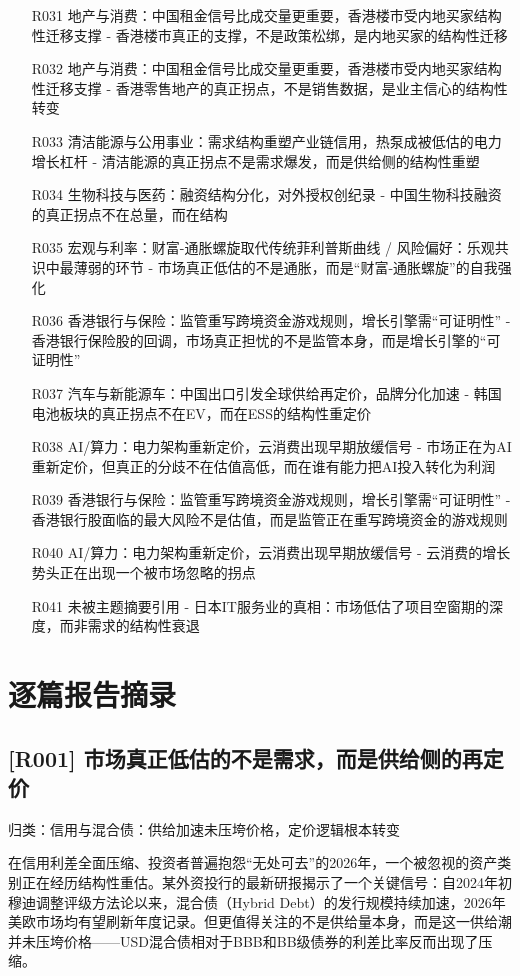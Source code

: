 \documentclass[11pt]{ctexart}
\begin{document}
\begin{itemize}
  \item [R031] 地产与消费：中国租金信号比成交量更重要，香港楼市受内地买家结构性迁移支撑 - 香港楼市真正的支撑，不是政策松绑，是内地买家的结构性迁移
  \item [R032] 地产与消费：中国租金信号比成交量更重要，香港楼市受内地买家结构性迁移支撑 - 香港零售地产的真正拐点，不是销售数据，是业主信心的结构性转变
  \item [R033] 清洁能源与公用事业：需求结构重塑产业链信用，热泵成被低估的电力增长杠杆 - 清洁能源的真正拐点不是需求爆发，而是供给侧的结构性重塑
  \item [R034] 生物科技与医药：融资结构分化，对外授权创纪录 - 中国生物科技融资的真正拐点不在总量，而在结构
  \item [R035] 宏观与利率：财富-通胀螺旋取代传统菲利普斯曲线 / 风险偏好：乐观共识中最薄弱的环节 - 市场真正低估的不是通胀，而是“财富-通胀螺旋”的自我强化
  \item [R036] 香港银行与保险：监管重写跨境资金游戏规则，增长引擎需“可证明性” - 香港银行保险股的回调，市场真正担忧的不是监管本身，而是增长引擎的“可证明性”
  \item [R037] 汽车与新能源车：中国出口引发全球供给再定价，品牌分化加速 - 韩国电池板块的真正拐点不在EV，而在ESS的结构性重定价
  \item [R038] AI/算力：电力架构重新定价，云消费出现早期放缓信号 - 市场正在为AI重新定价，但真正的分歧不在估值高低，而在谁有能力把AI投入转化为利润
  \item [R039] 香港银行与保险：监管重写跨境资金游戏规则，增长引擎需“可证明性” - 香港银行股面临的最大风险不是估值，而是监管正在重写跨境资金的游戏规则
  \item [R040] AI/算力：电力架构重新定价，云消费出现早期放缓信号 - 云消费的增长势头正在出现一个被市场忽略的拐点
  \item [R041] 未被主题摘要引用 - 日本IT服务业的真相：市场低估了项目空窗期的深度，而非需求的结构性衰退
\end{itemize}
\section{逐篇报告摘录}
\subsection{[R001] 市场真正低估的不是需求，而是供给侧的再定价}
{\small\color{refgray}归类：信用与混合债：供给加速未压垮价格，定价逻辑根本转变}

在信用利差全面压缩、投资者普遍抱怨“无处可去”的2026年，一个被忽视的资产类别正在经历结构性重估。某外资投行的最新研报揭示了一个关键信号：自2024年初穆迪调整评级方法论以来，混合债（Hybrid Debt）的发行规模持续加速，2026年美欧市场均有望刷新年度记录。但更值得关注的不是供给量本身，而是这一供给潮并未压垮价格——USD混合债相对于BBB和BB级债券的利差比率反而出现了压缩。
\end{document}
